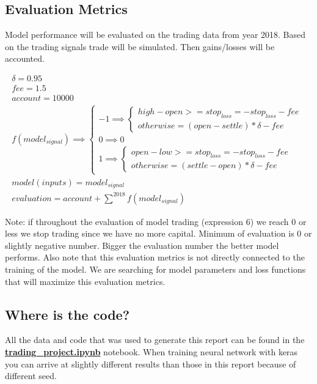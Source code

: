\documentclass[final,2p]{elsarticle}
\begin{document}
\subsection{Evaluation Metrics}
Model performance will be evaluated on the trading data from year 2018. Based on the trading signals trade will be simulated.
Then gains/losses will be accounted.

\begin{gather}
    \delta = 0.95\\
    fee = 1.5\\
    account = 10000\\
    f(model_{signal}) \implies
    \begin{cases}
        -1 \implies
        \begin{cases}
            high - open >= stop_{loss} = -stop_{loss} - fee\\
            otherwise = (open - settle)*\delta - fee
        \end{cases}\\
        0 \implies 0\\
        1 \implies
        \begin{cases}
            open - low >= stop_{loss} = -stop_{loss} - fee\\
            otherwise = (settle - open)*\delta - fee
        \end{cases}
    \end{cases}\\
model(inputs) = model_{signal}\\
evaluation = account + \sum^{2018} f(model_{signal})
\end{gather}

Note: if throughout the evaluation of model trading (expression 6) we reach 0 or less we stop trading since we have no more capital.
Minimum of evaluation is 0 or slightly negative number. Bigger the evaluation number the better model performs.
Also note that this evaluation metrics is not directly connected to the training of the model. We are searching for
model parameters and loss functions that will maximize this evaluation metrics.

\subsection{Where is the code?}
All the data and code that was used to generate this report can be found in the \href{https://github.com/IzidoroBaltazar/MachineLearningEngineer/blob/master/capstone\_project/trading\_project.ipynb}{\textbf{trading\_project.ipynb}} notebook.
When training neural network with keras you can arrive at slightly different results than those in this report because of different seed.
\end{document}
